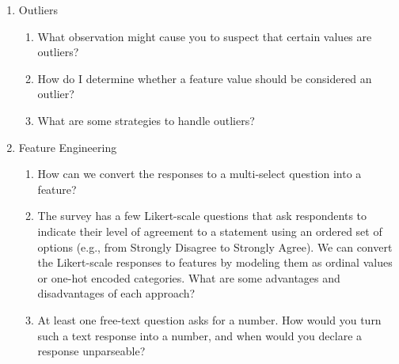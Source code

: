 \documentclass[12pt]{article}
\begin{document}
\begin{enumerate}
\begin{enumerate}
\item What are some common strategies to handle missing values? One is called imputation. 

\item When is it appropriate to use each strategy above to handle missing values?

\item 
Suppose that you decide to impute the median value for a numeric feature. Why is it problematic to do the imputation on the validation and test sets?

\item Finally, decide how missing values should be handled for each feature in our dataset, and record your decision.

\end{enumerate}

\item Outliers

\begin{enumerate}

\item What observation might cause you to suspect that certain values are outliers? 

\item How do I determine whether a feature value should be considered an outlier?

\item What are some strategies to handle outliers?

\end{enumerate}

\item Feature Engineering

\begin{enumerate}

\item How can we convert the responses to a multi-select question into a feature? 

\item The survey has a few Likert-scale questions that ask respondents to indicate their level of agreement to a statement using an ordered set of options (e.g., from Strongly Disagree to Strongly Agree). We can convert the Likert-scale responses to features by modeling them as ordinal values or one-hot encoded categories. What are some advantages and disadvantages of each approach?

\item At least one free-text question asks for a number. How would you turn such a text response into a number, and when would you declare a response unparseable?


\end{enumerate}
\end{enumerate}
\end{document}
